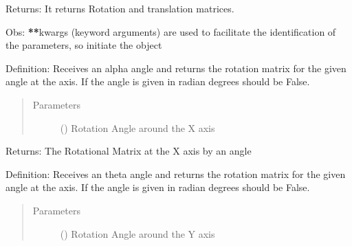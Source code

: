 \documentclass[letterpaper,10pt,english,openany,oneside]{sphinxmanual}
\begin{document}
\begin{fulllineitems}
Returns: It returns Rotation and translation matrices.

Obs: {\color{red}\bfseries{}**}kwargs (keyword arguments) are used to facilitate the identification of the parameters, so initiate the
object

\begin{fulllineitems}
\label{\detokenize{MatrixManipulationSymbolic:MatrixManipulationSymbolic.MatrixSymbolic.rot_x}}
Definition: Receives an alpha angle and returns the rotation matrix for the given angle at the  axis.
If the angle is given in radian degrees should be False.
\begin{quote}\begin{description}
\item[{Parameters}] \leavevmode
{} () \textendash{} Rotation Angle around the X axis

\end{description}\end{quote}

Returns: The Rotational Matrix at the X axis by an  angle

\end{fulllineitems}


\begin{fulllineitems}
\label{\detokenize{MatrixManipulationSymbolic:MatrixManipulationSymbolic.MatrixSymbolic.rot_y}}
Definition: Receives an theta angle and returns the rotation matrix for the given angle at the  axis.
If the angle is given in radian degrees should be False.
\begin{quote}\begin{description}
\item[{Parameters}] \leavevmode
{} () \textendash{} Rotation Angle around the Y axis

\end{description}\end{quote}


\end{fulllineitems}
\end{fulllineitems}
\end{document}
